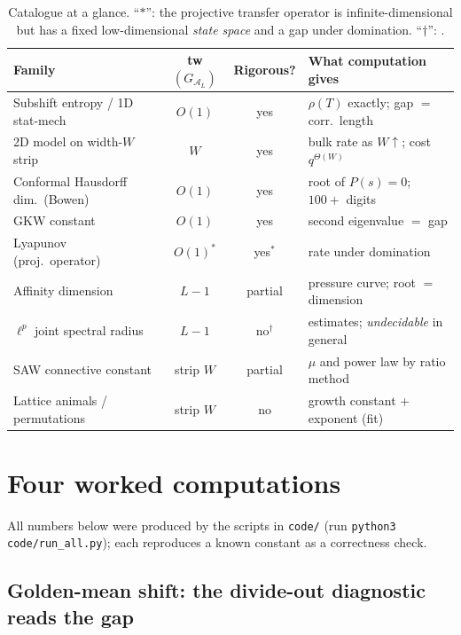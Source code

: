 \documentclass[11pt]{article}
\newcommand{\calA}{\mathcal{A}}
\newcommand{\graphform}[1]{G_{#1}}
\newcommand{\pressure}{P}
\theoremstyle{plain}
\theoremstyle{definition}
\theoremstyle{remark}
\begin{document}
\begin{table}[t]
\centering
\renewcommand{\arraystretch}{1.2}
\small
\begin{tabular}{@{}lccp{}@{}}
\toprule
\textbf{Family} & \textbf{\textsf{tw}$(\graphform{\calA_L})$} & \textbf{Rigorous?}
& \textbf{What computation gives}\\
\midrule
Subshift entropy / 1D stat-mech & $O(1)$ & yes & $\rho(T)$ exactly; gap $=$ corr.\ length\\
2D model on width-$W$ strip & $W$ & yes & bulk rate as $W\!\uparrow$; cost $q^{\Theta(W)}$\\
Conformal Hausdorff dim.\ (Bowen) & $O(1)$ & yes & root of $\pressure(s)=0$; $100+$ digits\\
GKW constant & $O(1)$ & yes & second eigenvalue $=$ gap\\
Lyapunov (proj.\ operator) & $O(1)^\ast$ & yes$^\ast$ & rate under domination\\
\midrule
Affinity dimension & $L-1$ & partial & pressure curve; root $=$ dimension\\
$\ell^p$ joint spectral radius & $L-1$ & no$^{\dagger}$ & estimates; \emph{undecidable} in general\\
SAW connective constant & strip $W$ & partial & $\mu$ and power law by ratio method\\
Lattice animals / permutations & strip $W$ & no & growth constant + exponent (fit)\\
\bottomrule
\end{tabular}
\caption{Catalogue at a glance. ``$\ast$'': the projective transfer operator is
infinite-dimensional but has a fixed low-dimensional \emph{state space} and a gap
under domination. ``$\dagger$'': \citet{blondel2000boundedness,bousch2002asymptotic}.}
\label{tab:catalogue}
\end{table}

\section{Four worked computations}
\label{sec:experiments}

All numbers below were produced by the scripts in \texttt{code/} (run
\texttt{python3 code/run\_all.py}); each reproduces a known constant as a
correctness check.

\subsection{Golden-mean shift: the divide-out diagnostic reads the gap}
\label{sec:exp-golden}
\end{document}
